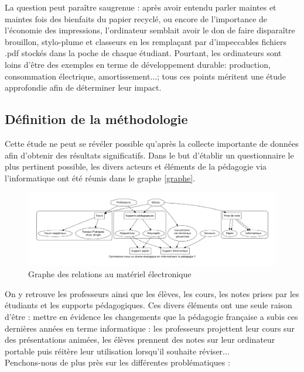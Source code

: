 \documentclass[a4paper,11pt,french]{report}
\begin{document}
La question peut paraître saugrenue : après avoir entendu parler maintes et maintes fois des bienfaits du papier recyclé, ou encore de l'importance de l'économie des impressions, l'ordinateur semblait avoir le don de faire disparaître brouillon, stylo-plume et classeurs en les remplaçant par d'impeccables fichiers .pdf stockés dans la poche de chaque étudiant. Pourtant, les ordinateurs sont loins d'être des exemples en terme de développement durable: production, consommation électrique, amortissement...; tous ces points méritent une étude approfondie afin de déterminer leur impact.\\

\subsection{Définition de la méthodologie}
Cette étude ne peut se révéler possible qu'après la collecte importante de données afin d'obtenir des résultats significatifs. Dans le but d'établir un questionnaire le plus pertinent possible, les divers acteurs et éléments de la pédagogie via l'informatique ont été réunis dans le graphe \vref{graphe}.\\

\begin{figure}[h!]
\includegraphics[width=\textwidth]{graphe.png}
\caption{Graphe des relations au matériel électronique}
\label{graphe}
\end{figure}

On y retrouve les professeurs ainsi que les élèves, les cours, les notes prises par les étudiants et les supports pédagogiques. Ces divers éléments ont une seule raison d'être : mettre en évidence les changements que la pédagogie française a subis ces dernières années en terme informatique : les professeurs projettent leur cours sur des présentations animées, les élèves prennent des notes sur leur ordinateur portable puis réitère leur utilisation lorsqu'il souhaite réviser...\\

Penchons-nous de plus près sur les différentes problématiques :
\end{document}
